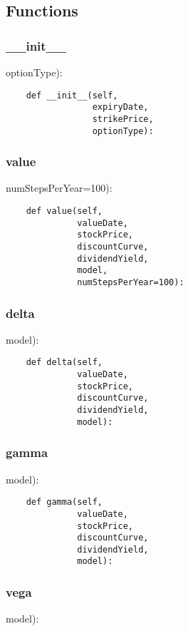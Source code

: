 \documentclass[twoside,11pt]{book}
\begin{document}
\subsection*{Functions}

\subsubsection*{{\bf \_\_init\_\_}}
optionType): 

\begin{lstlisting}
    def __init__(self,
                 expiryDate,
                 strikePrice,
                 optionType):
\end{lstlisting}

\subsubsection*{{\bf value}}
numStepsPerYear=100): 

\begin{lstlisting}
    def value(self,
              valueDate,
              stockPrice,
              discountCurve,
              dividendYield,
              model,
              numStepsPerYear=100):
\end{lstlisting}

\subsubsection*{{\bf delta}}
model): 

\begin{lstlisting}
    def delta(self,
              valueDate,
              stockPrice,
              discountCurve,
              dividendYield,
              model):
\end{lstlisting}

\subsubsection*{{\bf gamma}}
model): 

\begin{lstlisting}
    def gamma(self,
              valueDate,
              stockPrice,
              discountCurve,
              dividendYield,
              model):
\end{lstlisting}

\subsubsection*{{\bf vega}}
model): 
\end{document}

